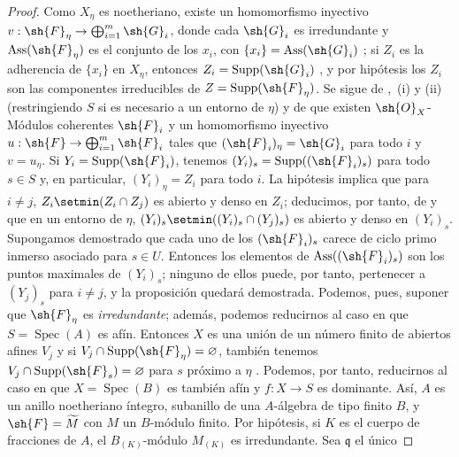 \begin{proof}
Como $X_\eta$ es noetheriano, existe un homomorfismo inyectivo $v:\sh{F}_\eta\to\bigoplus_{i=1}^m\sh{G}_i$, donde cada $\sh{G}_i$ es irredundante y $\operatorname{Ass}(\sh{F}_\eta)$ es el conjunto de los $x_i$, con $\{x_i\}=\operatorname{Ass}(\sh{G}_i)$ ; si $Z_i$ es la adherencia de $\{x_i\}$ en $X_\eta$, entonces $Z_i=\operatorname{Supp}(\sh{G}_i)$ , y por hipótesis los $Z_i$ son las componentes irreducibles de $Z=\operatorname{Supp}(\sh{F}_\eta)$.
Se sigue de ,~(i) y (ii) (restringiendo $S$ si es necesario a un entorno de $\eta$) y de  que existen $\sh{O}_X$-Módulos coherentes $\sh{F}_i$ y un homomorfismo inyectivo $u:\sh{F}\to\bigoplus_{i=1}^m\sh{F}_i$ tales que $(\sh{F}_i)_\eta=\sh{G}_i$ para todo $i$ y $v=u_\eta$.
Si $Y_i=\operatorname{Supp}(\sh{F}_i)$, tenemos $(Y_i)_s=\operatorname{Supp}((\sh{F}_i)_s)$ para todo $s\in S$  y, en particular, $(Y_i)_\eta=Z_i$ para todo $i$.
La hipótesis implica que para $i\neq j$, $Z_i\setmin(Z_i\cap Z_j)$ es abierto y denso en $Z_i$; deducimos, por tanto, de  y  que en un entorno de $\eta$, $(Y_i)_s\setmin((Y_i)_s\cap(Y_j)_s)$ es abierto y denso en $(Y_i)_s$.
Supongamos demostrado que cada uno de los $(\sh{F}_i)_s$ carece de ciclo primo inmerso asociado para $s\in U$.
Entonces los elementos de $\operatorname{Ass}((\sh{F}_i)_s)$ son los puntos maximales de $(Y_i)_s$; ninguno de ellos puede, por tanto, pertenecer a $(Y_j)_s$ para $i\neq j$, y la proposición quedará demostrada. Podemos, pues, suponer que $\sh{F}_\eta$ es \emph{irredundante}; además, podemos reducirnos al caso en que $S=\operatorname{Spec}(A)$ es afín. Entonces $X$ es una unión de un número finito de abiertos afines $V_j$ y si $V_j\cap\operatorname{Supp}(\sh{F}_\eta)=\varnothing$, también tenemos $V_j\cap\operatorname{Supp}(\sh{F}_s)=\varnothing$ para $s$ próximo a $\eta$ . Podemos, por tanto, reducirnos al caso en que $X=\operatorname{Spec}(B)$ es también afín y $f:X\to S$ es dominante. Así, $A$ es un anillo noetheriano íntegro, subanillo de una $A$-álgebra de tipo finito $B$, y $\sh{F}=\widetilde{M}$ con $M$ un $B$-módulo finito. Por hipótesis, si $K$ es el cuerpo de fracciones de $A$, el $B_{(K)}$-módulo $M_{(K)}$ es irredundante.
Sea $\mathfrak{q}$ el único



\end{proof}
